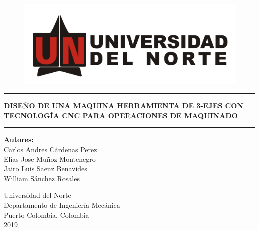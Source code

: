 \newcommand{\TitleProject}{\uppercase{Diseño de una maquina herramienta de 3-ejes con tecnología CNC para operaciones de maquinado}}

\newcommand{\AuthorProject}{Carlos Andres Cárdenas Perez\\
        Elías Jose Muñoz Montenegro\\
        Jairo Luis Saenz Benavides\\
        William Sánchez Rosales}
\thispagestyle{empty}
\begin{figure}
    \centering
    \includegraphics[scale=0.4]{Cap0_Titulo/EscudoUN.pdf}
\end{figure}

\begin{center}
    \rule{\linewidth}{0.5pt}
        \LARGE{ \textbf{ \TitleProject } }
    \rule{\linewidth}{2pt}
\end{center}
\vspace{2cm}
\begin{center}
    \large
    \textbf{Autores:} \\
        \AuthorProject
\end{center}
\vfill
\begin{center}
    Universidad del Norte\\
    Departamento de Ingeniería Mecánica\\
    Puerto Colombia, Colombia\\
    2019
\end{center}

\newpage
\thispagestyle{empty}
~
\newpage

